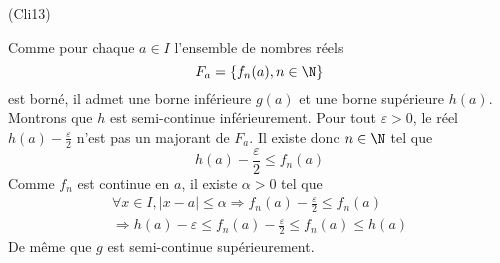 \begin{tiny}(Cli13)\end{tiny}
Comme pour chaque $a\in I$ l'ensemble de nombres réels
\begin{displaymath}
  F_a = \left\lbrace f_n(a) , n\in \N\right\rbrace 
\end{displaymath}
est borné, il admet une borne inférieure $g(a)$ et une borne supérieure $h(a)$.\newline
Montrons que $h$ est semi-continue inférieurement.\newline
Pour tout $\varepsilon >0$, le réel $h(a)-\frac{\varepsilon}{2}$ n'est pas un majorant de $F_a$. Il existe donc $n\in \N$ tel que
\begin{displaymath}
  h(a)-\frac{\varepsilon}{2} \leq f_n(a)
\end{displaymath}
Comme $f_n$ est continue en $a$, il existe $\alpha >0$ tel que
\begin{multline*}
\forall x\in I, \left|x-a\right| \leq \alpha \Rightarrow f_n(a) - \frac{\varepsilon}{2} \leq f_n(a) \\
\Rightarrow h(a) - \varepsilon \leq f_n(a) - \frac{\varepsilon}{2} \leq f_n(a) \leq h(a)
\end{multline*}
De même que $g$ est semi-continue supérieurement.